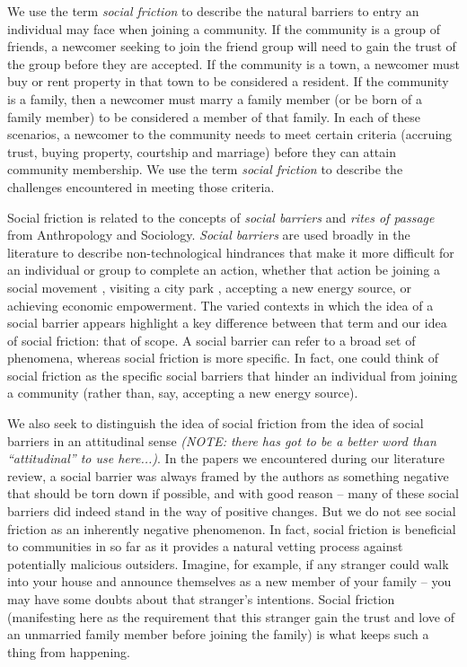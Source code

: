 \documentclass[sigconf,authordraft]{acmart}
\begin{document}
We use the term {\itshape social friction} to describe the natural barriers to entry an individual may face when joining a community. If the community is a group of friends, a newcomer seeking to join the friend group will need to gain the trust of the group before they are accepted. If the community is a town, a newcomer must buy or rent property in that town to be considered a resident. If the community is a family, then a newcomer must marry a family member (or be born of a family member) to be considered a member of that family. In each of these scenarios, a newcomer to the community needs to meet certain criteria (accruing trust, buying property, courtship and marriage) before they can attain community membership. We use the term {\itshape social friction} to describe the challenges encountered in meeting those criteria. 

Social friction is related to the concepts of \textit{social barriers} and \textit{rites of passage} from Anthropology and Sociology. {\itshape Social barriers} are used broadly in the literature to describe non-technological hindrances that make it more difficult for an individual or group to complete an action, whether that action be joining a social movement \cite{klandermans1987potentials}, visiting a city park \cite{cutts2009city}, accepting a new energy source\cite{pasqualetti2011social}, or achieving economic empowerment\cite{woolcock2000removing}. The varied contexts in which the idea of a social barrier appears highlight a key difference between that term and our idea of social friction: that of scope. A social barrier can refer to a broad set of phenomena, whereas social friction is more specific. In fact, one could think of social friction as the specific social barriers that hinder an individual from joining a community (rather than, say, accepting a new energy source). 

We also seek to distinguish the idea of social friction from the idea of social barriers in an attitudinal sense \textit{(NOTE: there has got to be a better word than ``attitudinal'' to use here...)}. In the papers we encountered during our literature review, a social barrier was always framed by the authors as something negative that should be torn down if possible, and with good reason -- many of these social barriers did indeed stand in the way of positive changes. But we do not see social friction as an inherently negative phenomenon. In fact, social friction is beneficial to communities in so far as it provides a natural vetting process against potentially malicious outsiders. Imagine, for example, if any stranger could walk into your house and announce themselves as a new member of your family -- you may have some doubts about that stranger's intentions. Social friction (manifesting here as the requirement that this stranger gain the trust and love of an unmarried family member before joining the family) is what keeps such a thing from happening. 
\end{document}
